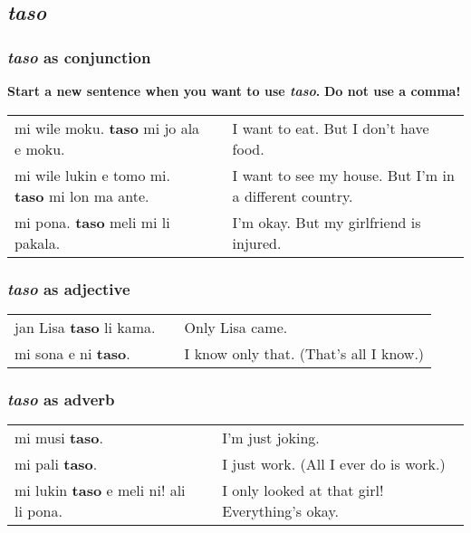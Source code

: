 \subsection*{\textit{taso}}
\subsubsection*{\textit{taso} as conjunction}
%
\textbf{Start a new sentence when you want to use \textit{taso}.} 
\textbf{Do not use a comma!} 

\begin{supertabular}{p{5,5cm}|ll}
mi wile moku. \textbf{taso} mi jo ala e moku. && I want to eat. But I don't have food. \\ 
mi wile lukin e tomo mi. \textbf{taso} mi lon ma ante. && I want to see my house. But I'm in a different country. \\ 
mi pona. \textbf{taso} meli mi li pakala. && I'm okay. But my girlfriend is injured. \\
\end{supertabular} 
%
\subsubsection*{\textit{taso} as adjective}
%
\begin{supertabular}{p{5,5cm}|ll}
jan Lisa \textbf{taso} li kama. && Only Lisa came. \\
mi sona e ni \textbf{taso}. && I know only that. (That's all I know.) \\
\end{supertabular} 
%
\subsubsection*{\textit{taso} as adverb}
%
\begin{supertabular}{p{5,5cm}|ll}
mi musi \textbf{taso}. && I'm just joking. \\
mi pali \textbf{taso}. && I just work. (All I ever do is work.) \\ 
mi lukin \textbf{taso} e meli ni! ali li pona. && I only looked at that girl! Everything's okay. \\
\end{supertabular} 
%
